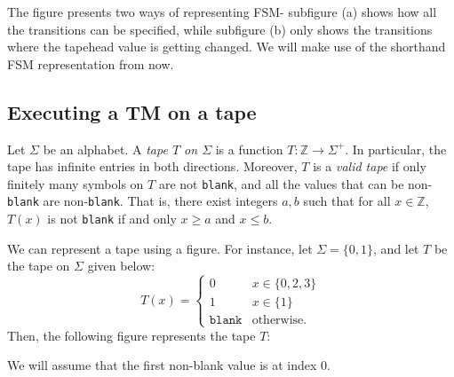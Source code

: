 The figure presents two ways of representing FSM- subfigure (a) shows how all the transitions can be specified, while subfigure (b) only shows the transitions where the tapehead value is getting changed. We will make use of the shorthand FSM representation from now.

\subsection{Executing a TM on a tape}
Let $\Sigma$ be an alphabet. A \emph{tape $T$ on $\Sigma$} is a function $T\colon \mathbb{Z} \to \Sigma^+$. In particular, the tape has infinite entries in both directions. Moreover, $T$ is a \emph{valid tape} if only finitely many symbols on $T$ are not \texttt{blank}, and all the values that can be non-\texttt{blank} are non-\texttt{blank}. That is, there exist integers $a, b$ such that for all $x \in \mathbb{Z}$, $T(x)$ is not \texttt{blank} if and only $x \geq a$ and $x \leq b$. 

We can represent a tape using a figure. For instance, let $\Sigma = \{0, 1\}$, and let $T$ be the tape on $\Sigma$ given below:
\[T(x) = \begin{cases}
    0 & x \in \{0, 2, 3\} \\
    1 & x \in \{1\} \\
    \texttt{blank} & \text{otherwise}.
\end{cases}\]
Then, the following figure represents the tape $T$:
\begin{figure}[H]
    \centering
\end{figure}
We will assume that the first non-blank value is at index 0.

